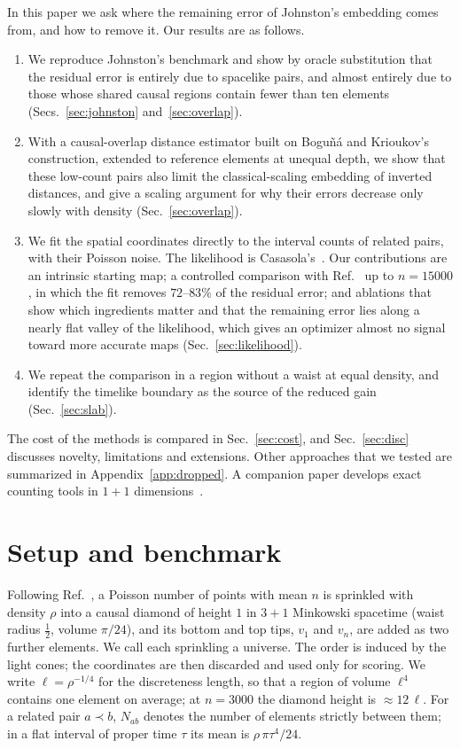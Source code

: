 \documentclass[prd,twocolumn,superscriptaddress,nofootinbib,amsmath,amssymb,floatfix]{revtex4-2}
\begin{document}
In this paper we ask where the remaining error of Johnston's embedding comes from, and how to remove it. Our results are as follows.
\begin{enumerate}
\item We reproduce Johnston's benchmark and show by oracle substitution that the residual error is entirely due to spacelike pairs, and almost entirely due to those whose shared causal regions contain fewer than ten elements (Secs.~\ref{sec:johnston} and~\ref{sec:overlap}).
\item With a causal-overlap distance estimator built on Bogu\~n\'a and Krioukov's construction, extended to reference elements at unequal depth, we show that these low-count pairs also limit the classical-scaling embedding of inverted distances, and give a scaling argument for why their errors decrease only slowly with density (Sec.~\ref{sec:overlap}).
\item We fit the spatial coordinates directly to the interval counts of related pairs, with their Poisson noise. The likelihood is Casasola's~\cite{Casasola26}. Our contributions are an intrinsic starting map; a controlled comparison with Ref.~\cite{Johnston25} up to $n=15000$, in which the fit removes $72$--$83\%$ of the residual error; and ablations that show which ingredients matter and that the remaining error lies along a nearly flat valley of the likelihood, which gives an optimizer almost no signal toward more accurate maps (Sec.~\ref{sec:likelihood}).
\item We repeat the comparison in a region without a waist at equal density, and identify the timelike boundary as the source of the reduced gain (Sec.~\ref{sec:slab}).
\end{enumerate}
The cost of the methods is compared in Sec.~\ref{sec:cost}, and Sec.~\ref{sec:disc} discusses novelty, limitations and extensions. Other approaches that we tested are summarized in Appendix~\ref{app:dropped}. A companion paper develops exact counting tools in $1+1$ dimensions~\cite{Toolkit}.

\section{Setup and benchmark}\label{sec:setup}
Following Ref.~\cite{Johnston25}, a Poisson number of points with mean $n$ is sprinkled with density $\rho$ into a causal diamond of height $1$ in $3+1$ Minkowski spacetime (waist radius $\tfrac12$, volume $\pi/24$), and its bottom and top tips, $v_1$ and $v_n$, are added as two further elements. We call each sprinkling a universe. The order is induced by the light cones; the coordinates are then discarded and used only for scoring. We write $\ell=\rho^{-1/4}$ for the discreteness length, so that a region of volume $\ell^4$ contains one element on average; at $n=3000$ the diamond height is $\approx 12\,\ell$. For a related pair $a\prec b$, $N_{ab}$ denotes the number of elements strictly between them; in a flat interval of proper time $\tau$ its mean is $\rho\,\pi\tau^4/24$.
\end{document}
